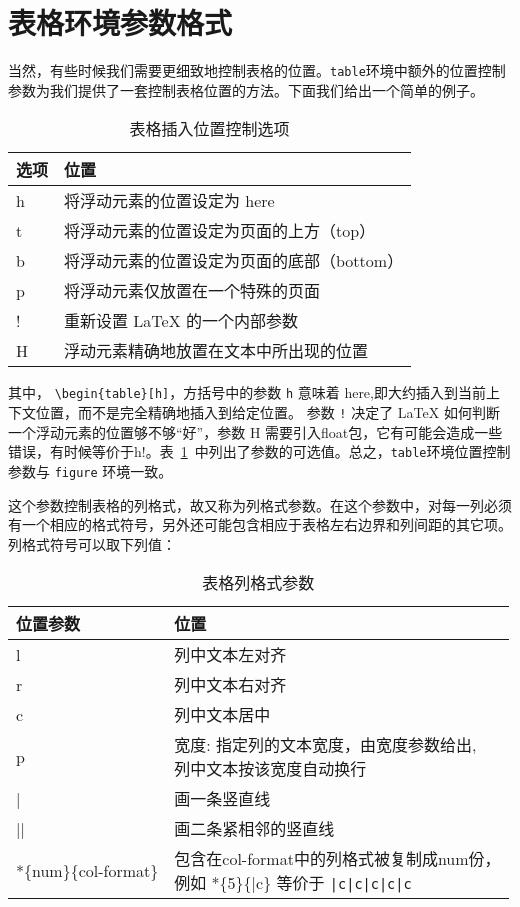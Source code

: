 \section{表格环境参数格式}
当然，有些时候我们需要更细致地控制表格的位置。\verb|table|环境中额外的位置控制参数为我们提供了一套控制表格位置的方法。下面我们给出一个简单的例子。
\begin{table}[!hpbt]
    \caption[表格插入位置控制选项]{\enspace 表格插入位置控制选项}
    \label{tab:table-position-options}
    \centering
    \normalsize%
    \setlength{\tabcolsep}{4pt}%
    \begin{tabular}{ll}
    \toprule
    选项 & 位置 \\
    \midrule
    h	& 将浮动元素的位置设定为 here\\
    t	& 将浮动元素的位置设定为页面的上方（top）\\
    b	& 将浮动元素的位置设定为页面的底部（bottom）\\
    p	& 将浮动元素仅放置在一个特殊的页面\\
    !	& 重新设置 \LaTeX{} 的一个内部参数\\
    H	& 浮动元素精确地放置在文本中所出现的位置\\
    \bottomrule
    \end{tabular}
\end{table}
其中， \verb|\begin{table}[h]|，方括号中的参数 \verb|h| 意味着 here,即大约插入到当前上下文位置，而不是完全精确地插入到给定位置。 参数 \verb|!| 决定了 \LaTeX{} 如何判断一个浮动元素的位置够不够“好”，参数 H 需要引入float包，它有可能会造成一些错误，有时候等价于h!。表~\ref{tab:table-position-options}~中列出了参数的可选值。总之，\verb|table|环境位置控制参数与 \verb|figure| 环境一致。

这个参数控制表格的列格式，故又称为列格式参数。在这个参数中，对每一列必须有一个相应的格式符号，另外还可能包含相应于表格左右边界和列间距的其它项。列格式符号可以取下列值：
\begin{table}[!hpbt]
    \caption[表格列格式参数]{\enspace 表格列格式参数}
    \label{tab:table-col-options}
    \centering
    \normalsize%
    \setlength{\tabcolsep}{4pt}%
    \begin{tabular}{ll}
    \toprule
    位置参数 & 位置 \\
    \midrule
    l	& 列中文本左对齐\\
    r	& 列中文本右对齐\\
    c	& 列中文本居中\\
    p	& \makecell[l]{宽度: 指定列的文本宽度，由宽度参数给出,\\ 列中文本按该宽度自动换行}\\
    |	& 画一条竖直线\\
    ||	& 画二条紧相邻的竖直线\\
    *\{num\}\{col-format\}& \makecell[l]{包含在col-format中的列格式被复制成num份，\\ 例如 *\{5\}\{|c\} 等价于 \texttt{|c|c|c|c|c}}\\
    \bottomrule
    \end{tabular}
\end{table}

